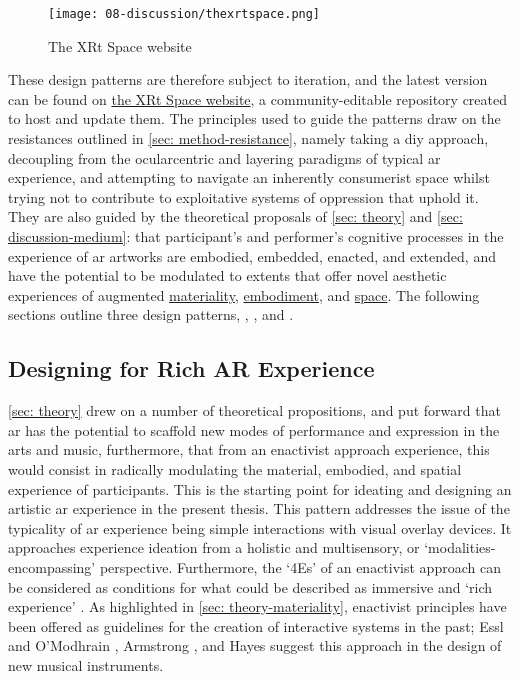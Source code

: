 \begin{figure}
    \centering
    {\texttt{[image: 08-discussion/thexrtspace.png]}}
    \caption[The XRt Space website]{The XRt Space website}
\end{figure}\label{fig: thexrtspace}

These design patterns are therefore subject to iteration, and the latest version can be found on \href{https://sambilbow.github.io/thexrtspace}{the XRt Space website}, a community-editable repository created to host and update them. The principles used to guide the patterns draw on the resistances outlined in \autoref{sec: method-resistance}, namely taking a \gls{diy} approach, decoupling from the ocularcentric and layering paradigms of typical \gls{ar} experience, and attempting to navigate an inherently consumerist space whilst trying not to contribute to exploitative systems of oppression that uphold it. They are also guided by the theoretical proposals of \autoref{sec: theory} and \autoref{sec: discussion-medium}: that participant's and performer's cognitive processes in the experience of \gls{ar} artworks are embodied, embedded, enacted, and extended, and have the potential to be modulated to extents that offer novel aesthetic experiences of augmented \hyperref[sec: discussion-medium-material]{materiality}, \hyperref[sec: discussion-medium-embodiment]{embodiment}, and \hyperref[sec: discussion-medium-space]{space}. The following sections outline three design patterns, \textit{}, \textit{}, and \textit{}.

\subsection{Designing for Rich AR Experience}\label{sec: discussion-patterns-experience} 
\autoref{sec: theory} drew on a number of theoretical propositions, and put forward that \gls{ar} has the potential to scaffold new modes of performance and expression in the arts and music, furthermore, that from an enactivist approach experience, this would consist in radically modulating the material, embodied, and spatial experience of participants. This is the starting point for ideating and designing an artistic \gls{ar} experience in the present thesis. This pattern addresses the issue of the typicality of \gls{ar} experience being simple interactions with visual overlay devices. It approaches experience ideation from a holistic and multisensory, or `modalities-encompassing' \citep{schraffenberger2018} perspective. Furthermore, the `4Es' of an enactivist approach can be considered as conditions for what could be described as immersive and `rich experience' \citep{bilbow2021}. As highlighted in \autoref{sec: theory-materiality}, enactivist principles have been offered as guidelines for the creation of interactive systems in the past; Essl and O'Modhrain \citeyearpar{essl2006}, Armstrong \citeyearpar{armstrong2006}, and Hayes \citeyearpar{hayes2019} suggest this approach in the design of new musical instruments. 

